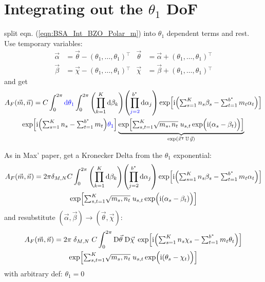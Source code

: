 \documentclass[
	english,
	a4paper,
	fontsize=10pt,
	parskip=half,
	titlepage=true,
	DIV=12,
	final
]{scrreprt}
\newcommand*{\transp}{\ensuremath{^\intercal}}
\newcommand*{\iunit}{\ensuremath{\mathrm{i}}}
\newcommand*{\DD}[1]{\ensuremath{\text{D}\vec{#1}\;}}
\begin{document}
\section{Integrating out the $\theta_1$ DoF}
split eqn. (\ref{eqn:BSA_Int_BZO_Polar_m}) into $\theta_1$ dependent terms and rest. Use temporary variables:
\begin{align}
	\vec{\alpha} &= \vec{\theta} - (\theta_1, \ldots, \theta_1)\transp
	&
	\vec{\theta} &= \vec{\alpha} + (\theta_1, \ldots, \theta_1)\transp
\\
	\vec{\beta } &= \vec{\chi  } - (\theta_1, \ldots, \theta_1)\transp
	&
	\vec{\chi  } &= \vec{\beta } + (\theta_1, \ldots, \theta_1)\transp
\end{align}
and get
\begin{multline}
	A_F(\vec{m}, \vec{n})
=
	C
	\int_{0}^{2\pi} {\color{blue} \dd{\theta_1}}
	\int_{0}^{2\pi}
		\qty( \prod_{k=1}               ^{K}   \dd{\beta_k} )
		\qty( \prod_{{\color{blue} j=2}}^{b^*} \dd{\alpha_j} )
			\exp[
				\iunit \qty(
				{\textstyle \sum_{s=1}^{K}   n_s \beta _s}   -
				{\textstyle \sum_{t=1}^{b^*} m_t \alpha_t}
			)]
\\
	\exp[
		\iunit \qty(
			{\textstyle \sum_{s=1}^{K}   n_s}   -
			{\textstyle \sum_{t=1}^{b^*} m_t}
		)
		{\color{blue} \theta_1}
	]
	\underbrace{
	\exp[
		{\textstyle \sum_{s,t=1}^{K} }
			\sqrt{m_s, n_t} \;
			u_{s,t}
			\exp(\Big. \iunit(\alpha_s - \beta_t) )
	]}_{\exp( \vec{x}\transp \, \mathbb{U} \, \vec{y})}
\end{multline}

As in Max' paper, get a Kronecker Delta from the $\theta_1$ exponential:
\begin{multline}	
	A_F(\vec{m}, \vec{n})
=
	2\pi \delta_{M,N} C
	\int_{0}^{2\pi}
		\qty( \prod_{k=1}^{K}   \dd{\beta _k} )
		\qty( \prod_{j=2}^{b^*} \dd{\alpha_j} )
	\exp[
		\iunit \qty(
		{\textstyle \sum_{s=1}^{K}   n_s \beta _s}   -
		{\textstyle \sum_{t=1}^{b^*} m_t \alpha_t}
	)]
\\
	\exp[
		{\textstyle \sum_{s,t=1}^{K} }
			\sqrt{m_s, n_t} \;
			u_{s,t}
			\exp(\Big. \iunit(\alpha_s - \beta_t) )
	]
\end{multline}
and resubstitute $(\vec{\alpha}, \vec{\beta}) \to (\vec{\theta}, \vec{\chi})$:
\begin{multline}	
	A_F(\vec{m}, \vec{n})
=
	2\pi \; \delta_{M,N} \; C
	\int_{0}^{2\pi}
		\DD{\theta} \DD{\chi}
	\exp[
		\iunit \qty(
		{\textstyle \sum_{s=1}^{K}   n_s \chi  _s}   -
		{\textstyle \sum_{t=1}^{b^*} m_t \theta_t}
	)]
\\
	\exp[
		{\textstyle \sum_{s,t=1}^{K} }
			\sqrt{m_s, n_t} \;
			u_{s,t}
			\exp(\Big. \iunit(\theta_s - \chi_t) )
	]
\end{multline}
with arbitrary def: $\theta_1 = 0$
\end{document}
